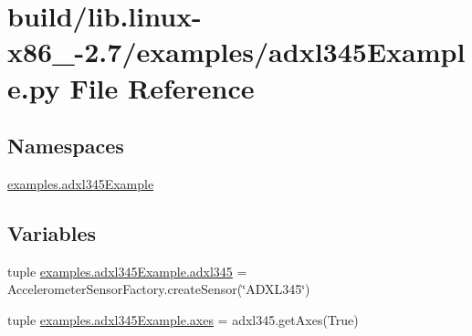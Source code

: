 \hypertarget{build_2lib_8linux-x86__64-2_87_2examples_2adxl345Example_8py}{}\section{build/lib.linux-\/x86\+\_-\/2.7/examples/adxl345\+Example.py File Reference}
\label{build_2lib_8linux-x86__64-2_87_2examples_2adxl345Example_8py}
\subsection*{Namespaces}
\begin{DoxyCompactItemize}
\item 
 \hyperlink{namespaceexamples_1_1adxl345Example}{examples.\+adxl345\+Example}
\end{DoxyCompactItemize}
\subsection*{Variables}
\begin{DoxyCompactItemize}
\item 
tuple \hyperlink{namespaceexamples_1_1adxl345Example_acbf1ab53a4f4f5ca9ff7d8350ef22eed}{examples.\+adxl345\+Example.\+adxl345} = Accelerometer\+Sensor\+Factory.\+create\+Sensor(\char`\"{}A\+D\+X\+L345\char`\"{})
\item 
tuple \hyperlink{namespaceexamples_1_1adxl345Example_ac627645bad1f9994a1c3328734da0ae8}{examples.\+adxl345\+Example.\+axes} = adxl345.\+get\+Axes(True)
\end{DoxyCompactItemize}
